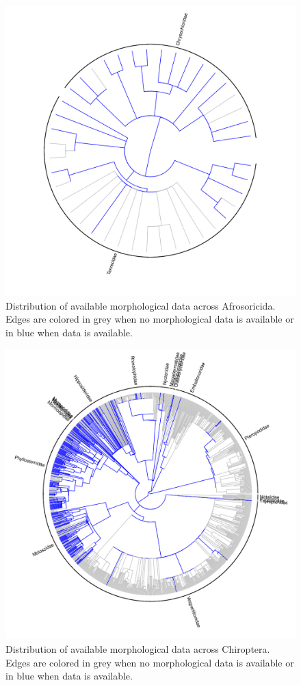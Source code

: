 \documentclass[12pt,letterpaper]{article}
\begin{document}
\begin{figure}[!htbp]
\centering
    \includegraphics[width=1\textwidth]{Supp_figure_AFROSORICIDA.pdf}
\caption{Distribution of available morphological data across Afrosoricida. Edges are colored in grey when no morphological data is available or in blue when data is available.}
\label{Supp_Figure_Phylo-Afrosoricida}
\end{figure}

\begin{figure}[!htbp]
\centering
    \includegraphics[width=1\textwidth]{Supp_figure_CHIROPTERA.pdf}
\caption{Distribution of available morphological data across Chiroptera. Edges are colored in grey when no morphological data is available or in blue when data is available.}
\label{Supp_Figure_Phylo-Chiroptera}
\end{figure}
\end{document}
